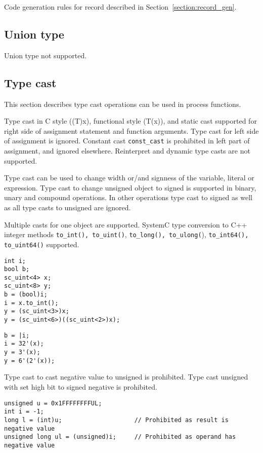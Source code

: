 Code generation rules for record described in Section~\ref{section:record_gen}. 


\subsection{Union type}

Union type not supported.

\subsection{Type cast}

This section describes type cast operations can be used in process functions. 

Type cast in C style ((T)x), functional style (T(x)), and static cast supported for right side of assignment statement and function arguments. Type cast for left side of assignment is ignored. 
Constant cast {\tt const\_cast} is prohibited in left part of assignment, and ignored elsewhere. Reinterpret and dynamic type casts are not supported.

Type cast can be used to change width or/and signness of the variable, literal or expression. 
Type cast to change unsigned object to signed is supported in binary, unary and compound operations. In other operations type cast to signed as well as all type casts to unsigned are ignored. 

Multiple casts for one object are supported. 
SystemC type conversion to C++ integer methods {\tt to\_int(), to\_uint()}, {\tt to\_long(), to\_ulong(}), {\tt to\_int64(), to\_uint64()} supported. 
%
\begin{lstlisting}[style=mycpp]
int i;
bool b;
sc_uint<4> x;
sc_uint<8> y;
b = (bool)i; 
i = x.to_int();
y = (sc_uint<3>)x;
y = (sc_uint<6>)((sc_uint<2>)x);
\end{lstlisting}
%
\begin{lstlisting}[style=myverilog]
b = |i;
i = 32'(x);
y = 3'(x);
y = 6'(2'(x));
\end{lstlisting}

Type cast to cast negative value to unsigned is prohibited. Type cast unsigned with set high bit to signed negative is prohibited.
%
\begin{lstlisting}[style=mycpp]
unsigned u = 0x1FFFFFFFFUL;
int i = -1;
long l = (int)u;                    // Prohibited as result is negative value
unsigned long ul = (unsigned)i;     // Prohibited as operand has negative value
\end{lstlisting}

